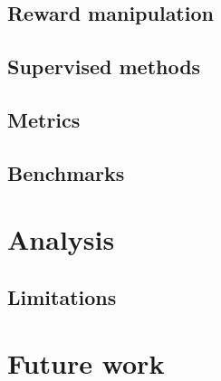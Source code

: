 \documentclass[conference]{IEEEtran}
\begin{document}
\subsection{Reward manipulation}

\subsection{Supervised methods}

\subsection{Metrics}

\subsection{Benchmarks}

\section{Analysis}

\subsection{Limitations}

\section{Future work}





















\end{document}
